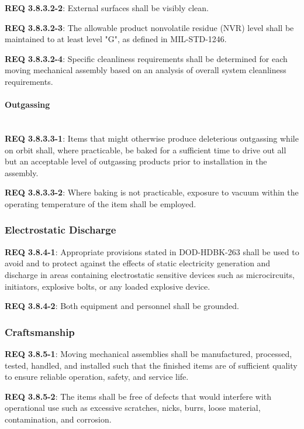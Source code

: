 \documentclass[12pt]{article}
\begin{document}
\noindent \textbf{REQ 3.8.3.2-2}: External surfaces shall be visibly clean. 

\noindent \textbf{REQ 3.8.3.2-3}: The allowable product nonvolatile residue (NVR) level shall be maintained to at least level "G", as defined in MIL-STD-1246. 

\noindent \textbf{REQ 3.8.3.2-4}: Specific cleanliness requirements shall be determined for each moving mechanical assembly based on an analysis of overall system cleanliness requirements.


\paragraph{Outgassing} \mbox{} \\ %
\noindent \textbf{REQ 3.8.3.3-1}: Items that might otherwise produce deleterious outgassing while on orbit shall, where practicable, be baked for a sufficient time to drive out all but an acceptable level of outgassing products prior to installation in the assembly.
 
\noindent \textbf{REQ 3.8.3.3-2}: Where baking is not practicable, exposure to vacuum within the operating temperature of the item shall be employed.


\subsubsection{Electrostatic Discharge} %
\noindent \textbf{REQ 3.8.4-1}: Appropriate provisions stated in DOD-HDBK-263 shall be used to avoid and to protect against the effects of static electricity generation and discharge in areas containing electrostatic sensitive devices such as microcircuits, initiators, explosive bolts, or any loaded explosive device. 

\noindent \textbf{REQ 3.8.4-2}: Both equipment and personnel shall be grounded.


\subsubsection{Craftsmanship} %
\noindent \textbf{REQ 3.8.5-1}: Moving mechanical assemblies shall be manufactured, processed, tested, handled, and installed such that the finished items are of sufficient quality to ensure reliable operation, safety, and service life. 

\noindent \textbf{REQ 3.8.5-2}: The items shall be free of defects that would interfere with operational use such as excessive scratches, nicks, burrs, loose material, contamination, and corrosion.
\end{document}
